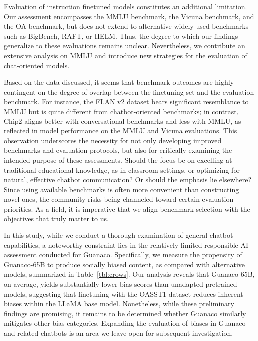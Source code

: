 Evaluation of instruction finetuned models constitutes an additional limitation. Our assessment encompasses the MMLU benchmark, the Vicuna benchmark, and the OA benchmark, but does not extend to alternative widely-used benchmarks such as BigBench, RAFT, or HELM. Thus, the degree to which our findings generalize to these evaluations remains unclear. Nevertheless, we contribute an extensive analysis on MMLU and introduce new strategies for the evaluation of chat-oriented models.

Based on the data discussed, it seems that benchmark outcomes are highly contingent on the degree of overlap between the finetuning set and the evaluation benchmark. For instance, the FLAN v2 dataset bears significant resemblance to MMLU but is quite different from chatbot-oriented benchmarks; in contrast, Chip2 aligns better with conversational benchmarks and less with MMLU, as reflected in model performance on the MMLU and Vicuna evaluations. This observation underscores the necessity for not only developing improved benchmarks and evaluation protocols, but also for critically examining the intended purpose of these assessments. Should the focus be on excelling at traditional educational knowledge, as in classroom settings, or optimizing for natural, effective chatbot communication? Or should the emphasis lie elsewhere? Since using available benchmarks is often more convenient than constructing novel ones, the community risks being channeled toward certain evaluation priorities. As a field, it is imperative that we align benchmark selection with the objectives that truly matter to us.

In this study, while we conduct a thorough examination of general chatbot capabilities, a noteworthy constraint lies in the relatively limited responsible AI assessment conducted for {Guanaco}. Specifically, we measure the propensity of {Guanaco}-65B to produce socially biased content, as compared with alternative models, summarized in Table~\ref{tbl:crows}. Our analysis reveals that {Guanaco}-65B, on average, yields substantially lower bias scores than unadapted pretrained models, suggesting that finetuning with the OASST1 dataset reduces inherent biases within the LLaMA base model. Nonetheless, while these preliminary findings are promising, it remains to be determined whether {Guanaco} similarly mitigates other bias categories. Expanding the evaluation of biases in {Guanaco} and related chatbots is an area we leave open for subsequent investigation.

